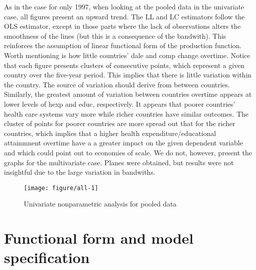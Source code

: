 \documentclass[12pt,a4paper]{article}\usepackage[]{graphicx}\usepackage[]{color}
\newenvironment{knitrout}{}{} %
\begin{document}
As in the case for only 1997, when looking at the pooled data in the univariate case, all figures present an upward trend. The LL and LC estimators follow the OLS estimator, except in those parts where the lack of observations alters the smoothness of the lines (but this is a consequence of the bandwith). This reinforces the assumption of linear functional form of the production function. Worth mentioning is how little countries' dale and comp change overtime. Notice that each figure presents clusters of consecutive points, which represent a given country over the five-year period. This implies that there is little variation within the country. The source of variation should derive from between countries. Similarly, the greatest amount of variation between countries overtime appears at lower levels of hexp and educ, respectively. It appears that poorer countries' health care systems vary more while richer countries have similar outcomes. The cluster of points for poorer countries are more spread out that for the richer countries, which implies that a higher health expenditure/educational attainmnent overtime have a a greater impact on the given dependent variable and which could point out to economies of scale. We do not, however, present the graphs for the multivariate case. Planes were obtained, but results were not insightful due to the large variation in bandwiths.

\begin{knitrout}
\color{fgcolor}\begin{figure}[htbp]

{\centering \texttt{[image: figure/all-1]} 

}

\caption[Univariate nonparametric analysis for pooled data]{Univariate nonparametric analysis for pooled data}\label{fig:all}
\end{figure}


\end{knitrout}







\section{Functional form and model specification}
\end{document}
